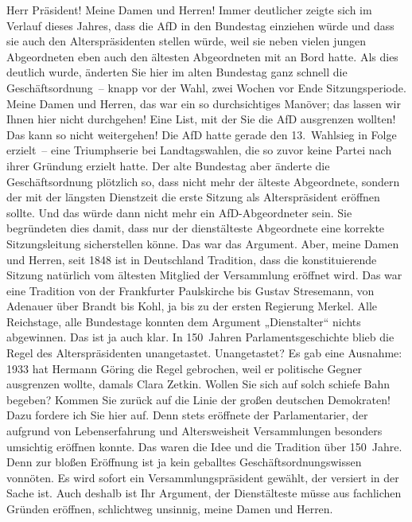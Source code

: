 \documentclass[a4paper,11pt]{article}
\begin{document}
Herr Präsident! Meine Damen und Herren! Immer deutlicher zeigte sich im Verlauf dieses Jahres, dass die AfD in den Bundestag einziehen würde und dass sie auch den Alterspräsidenten stellen würde, weil sie neben vielen jungen Abgeordneten eben auch den ältesten Abgeordneten mit an Bord hatte. Als dies deutlich wurde, änderten Sie hier im alten Bundestag ganz schnell die Geschäftsordnung – knapp vor der Wahl, zwei Wochen vor Ende Sitzungsperiode. Meine Damen und Herren, das war ein so durchsichtiges Manöver; das lassen wir Ihnen hier nicht durchgehen! Eine List, mit der Sie die AfD ausgrenzen wollten! Das kann so nicht weitergehen! Die AfD hatte gerade den 13. Wahlsieg in Folge erzielt – eine Triumphserie bei Landtagswahlen, die so zuvor keine Partei nach ihrer Gründung erzielt hatte. Der alte Bundestag aber änderte die Geschäftsordnung plötzlich so, dass nicht mehr der älteste Abgeordnete, sondern der mit der längsten Dienstzeit die erste Sitzung als Alterspräsident eröffnen sollte. Und das würde dann nicht mehr ein AfD-Abgeordneter sein. Sie begründeten dies damit, dass nur der dienstälteste Abgeordnete eine korrekte Sitzungsleitung sicherstellen könne. Das war das Argument. Aber, meine Damen und Herren, seit 1848 ist in Deutschland Tradition, dass die konstituierende Sitzung natürlich vom ältesten Mitglied der Versammlung eröffnet wird. Das war eine Tradition von der Frankfurter Paulskirche bis Gustav Stresemann, von Adenauer über Brandt bis Kohl, ja bis zu der ersten Regierung Merkel. Alle Reichstage, alle Bundestage konnten dem Argument „Dienstalter“ nichts abgewinnen. Das ist ja auch klar. In 150 Jahren Parlamentsgeschichte blieb die Regel des Alterspräsidenten unangetastet. Unangetastet? Es gab eine Ausnahme: 1933 hat Hermann Göring die Regel gebrochen, weil er politische Gegner ausgrenzen wollte, damals Clara Zetkin. Wollen Sie sich auf solch schiefe Bahn begeben? Kommen Sie zurück auf die Linie der großen deutschen Demokraten! Dazu fordere ich Sie hier auf. Denn stets eröffnete der Parlamentarier, der aufgrund von Lebenserfahrung und Altersweisheit Versammlungen besonders umsichtig eröffnen konnte. Das waren die Idee und die Tradition über 150 Jahre. Denn zur bloßen Eröffnung ist ja kein geballtes Geschäftsordnungswissen vonnöten. Es wird sofort ein Versammlungspräsident gewählt, der versiert in der Sache ist. Auch deshalb ist Ihr Argument, der Dienstälteste müsse aus fachlichen Gründen eröffnen, schlichtweg unsinnig, meine Damen und Herren.
\end{document}
